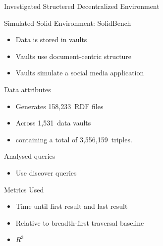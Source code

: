 \begin{frame}{Investigated Structered Decentralized Environment}
  \begin{block}{Simulated Solid Environment: SolidBench \cite{taelman2023link}}
    \begin{itemize}
        \item Data is stored in vaults
        \item Vaults use document-centric structure
        \item Vaults simulate a social media application
    \end{itemize}
  \end{block}
  \begin{block}{Data attributes}
        \begin{itemize}
            \item Generates 158,233~RDF files 
            \item Across 1,531~data vaults
            \item containing a total of 3,556,159~triples.
    \end{itemize}
  \end{block}
  \begin{block}{Analysed queries}
        \begin{itemize}
        \item Use discover queries
    \end{itemize}
  \end{block}
\end{frame}

\begin{frame}[t]{Metrics Used}
    \begin{itemize}
        \item Time until first result and last result
        \item Relative to breadth-first traversal baseline
        \item $R^{3}$
    \end{itemize}
\end{frame}
